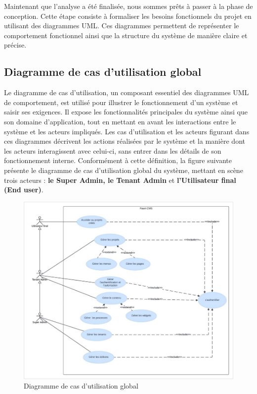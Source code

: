 \hspace{\parindent}Maintenant que l'analyse a été finalisée, nous sommes prêts à passer à la phase de conception. Cette étape consiste à formaliser les besoins fonctionnels du projet en utilisant des diagrammes UML. Ces diagrammes permettent de représenter le comportement fonctionnel ainsi que la structure du système de manière claire et précise.

\subsection{Diagramme de cas d’utilisation global}

\hspace{\parindent}Le diagramme de cas d'utilisation, un composant essentiel des diagrammes UML de comportement, est utilisé pour illustrer le fonctionnement d'un système et saisir ses exigences. Il expose les fonctionnalités principales du système ainsi que son domaine d'application, tout en mettant en avant les interactions entre le système et les acteurs impliqués. Les cas d'utilisation et les acteurs figurant dans ces diagrammes décrivent les actions réalisées par le système et la manière dont les acteurs interagissent avec celui-ci, sans entrer dans les détails de son fonctionnement interne. Conformément à cette définition, la figure suivante présente le diagramme de cas d'utilisation global du système, mettant en scène trois acteurs : \textbf{le Super Admin, le Tenant Admin} et \textbf{l'Utilisateur final (End user)}.




\begin{figure}[H]
  \centering
  \includegraphics[width=17cm]{Figures/use case globale.png}
  \caption{Diagramme de cas d'utilisation global}
\end{figure}





